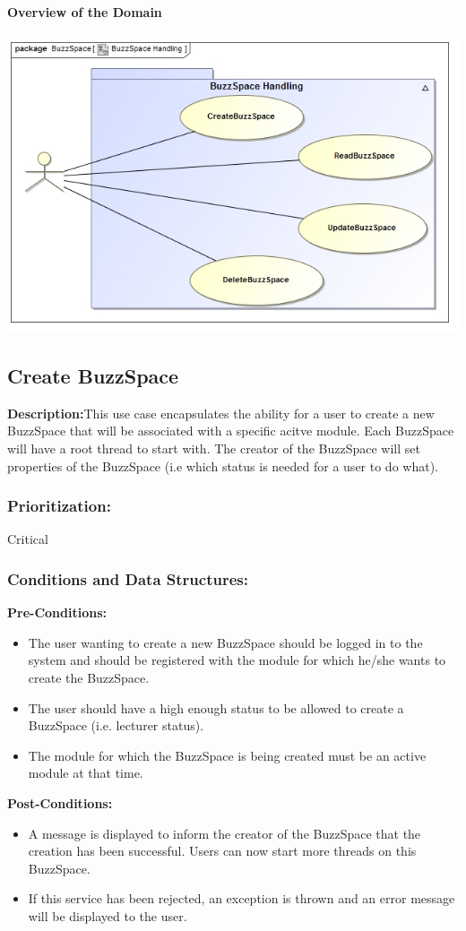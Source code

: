 \documentclass[a4paper,11pt]{article}
\begin{document}
\textbf{Overview of the Domain}\\\\
\includegraphics[width=1\linewidth]{./Images/BuzzSpaceHandling/Overview.jpg}\\
\subsection{Create BuzzSpace}
\textbf{Description:}This use case encapsulates the ability for a user to create a new BuzzSpace that will be associated with a specific acitve module. 
Each BuzzSpace will have a root thread to start with. The creator of the BuzzSpace will set properties of the BuzzSpace (i.e which status is needed for a user 
to do what). 
\subsubsection{Prioritization:}Critical
\subsubsection{Conditions and Data Structures:}
\textbf{Pre-Conditions:}
\begin{itemize}
	\item The user wanting to create a new BuzzSpace should be logged in to the system and should be registered with the module for which he/she wants to
	create the BuzzSpace. 
	\item The user should have a high enough status to be allowed to create a BuzzSpace (i.e. lecturer status).
	\item The module for which the BuzzSpace is being created must be an active module at that time.
\end{itemize}
\textbf{Post-Conditions:}
\begin{itemize}
	\item A message is displayed to inform the creator of the BuzzSpace that the creation has been successful. Users can now start more threads on this BuzzSpace.
	\item If this service has been rejected, an exception is thrown and an error message will be displayed to the user.
\end{itemize}
	
\end{document}
